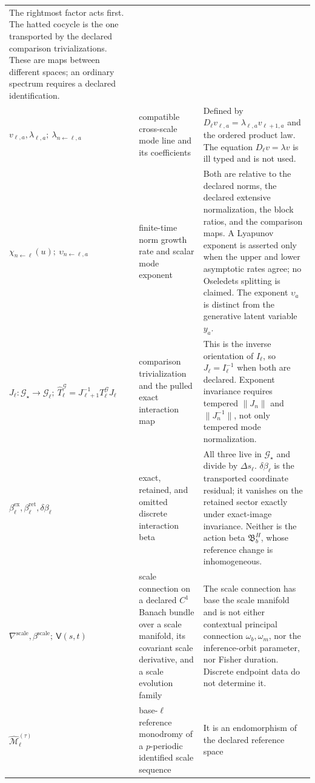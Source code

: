 \begin{longtable}{@{}>{\raggedright\arraybackslash}p{}
>{\raggedright\arraybackslash}p{}
>{\raggedright\arraybackslash}p{}@{}}
The rightmost factor acts first. The hatted cocycle is the one transported by
the declared comparison trivializations. These are maps between different
spaces; an ordinary spectrum requires a declared identification. \\
\(v_{\ell,a},\lambda_{\ell,a};\ \lambda_{n\leftarrow\ell,a}\) &
compatible cross-scale mode line and its coefficients &
Defined by \(D_\ell v_{\ell,a}=\lambda_{\ell,a}v_{\ell+1,a}\) and the ordered
product law. The equation \(D_\ell v=\lambda v\) is ill typed and is not
used. \\
\(\chi_{n\leftarrow\ell}(u);\ \upsilon_{n\leftarrow\ell,a}\) &
finite-time norm growth rate and scalar mode exponent &
Both are relative to the declared norms, the declared extensive normalization,
the block ratios, and the comparison maps.  A Lyapunov exponent is asserted only
when the upper and lower asymptotic rates agree; no Oseledets splitting is
claimed. The exponent \(\upsilon_a\) is distinct from the generative latent
variable \(y_a\). \\
\(J_\ell:\mathcal G_\star\to\mathcal G_\ell;\
  \widehat T_\ell^{\mathcal G}=J_{\ell+1}^{-1}T_\ell^{\mathcal G}J_\ell\) &
comparison trivialization and the pulled exact interaction map &
This is the inverse orientation of \(I_\ell\), so \(J_\ell=I_\ell^{-1}\) when
both are declared.  Exponent invariance requires tempered
\(\lVert J_n\rVert\) and \(\lVert J_n^{-1}\rVert\), not only tempered mode
normalization. \\
\(\beta_\ell^{\mathrm{ex}},\beta_\ell^{\mathrm{ret}},\delta\beta_\ell\) &
exact, retained, and omitted discrete interaction beta &
All three live in \(\mathcal G_\star\) and divide by \(\Delta s_\ell\).
\(\delta\beta_\ell\) is the transported coordinate residual; it vanishes on the
retained sector exactly under exact-image invariance.  Neither is the action
beta \(\mathfrak B_b^H\), whose reference change is inhomogeneous. \\
\(\nabla^{\mathrm{scale}},\beta^{\mathrm{scale}};\ \mathsf V(s,t)\) &
scale connection on a declared \(C^1\) Banach bundle over a scale manifold, its
covariant scale derivative, and a scale evolution family &
The scale connection has base the scale manifold and is not either contextual
principal connection \(\omega_b,\omega_m\), nor the inference-orbit parameter,
nor Fisher duration.  Discrete endpoint data do not determine it. \\
\(\widehat{\mathcal M}_\ell^{(\tau)}\) &
base-\(\ell\) reference monodromy of a \(p\)-periodic identified scale sequence &
It is an endomorphism of the declared reference space

\end{longtable}
